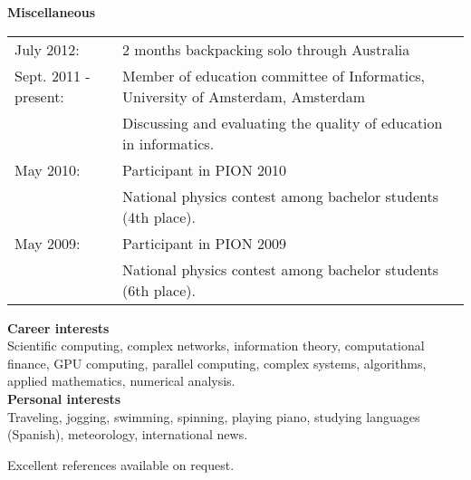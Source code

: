 \documentclass[11pt,a4paper,onecolumn]{article}
\begin{document}
{\Large \textbf{Miscellaneous} }
\begin{table}[H]
  \begin{tabular}{p{} p{}}

    July 2012: & 2 months backpacking solo through Australia \\

    Sept. 2011 - present: & Member of education committee of Informatics, University of Amsterdam, Amsterdam \\
    & {\small Discussing and evaluating the quality of education in informatics.} \\

    May 2010: & Participant in PION 2010 \\
    & {\small National physics contest among bachelor students (4th place). } \\

    May 2009: & Participant in PION 2009 \\
    & {\small National physics contest among bachelor students (6th place). } \\

  \end{tabular}
\end{table}

\newpage

{\Large \textbf{Career interests} } \\
Scientific computing, complex networks, information theory, computational finance, GPU computing, parallel computing, complex systems, algorithms, applied mathematics, numerical analysis.\\

{\Large \textbf{Personal interests} } \\
Traveling, jogging, swimming, spinning, playing piano, studying languages (Spanish), meteorology, international news.\\

\vspace{10pt}

{\large Excellent references available on request.}
\end{document}
